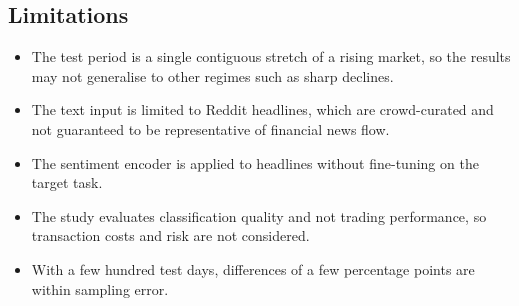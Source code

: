 \subsection{Limitations}
\begin{itemize}
  \item The test period is a single contiguous stretch of a rising market, so the results may not generalise to other regimes such as sharp declines.
  \item The text input is limited to Reddit headlines, which are crowd-curated and not guaranteed to be representative of financial news flow.
  \item The sentiment encoder is applied to headlines without fine-tuning on the target task.
  \item The study evaluates classification quality and not trading performance, so transaction costs and risk are not considered.
  \item With a few hundred test days, differences of a few percentage points are within sampling error.
\end{itemize}
